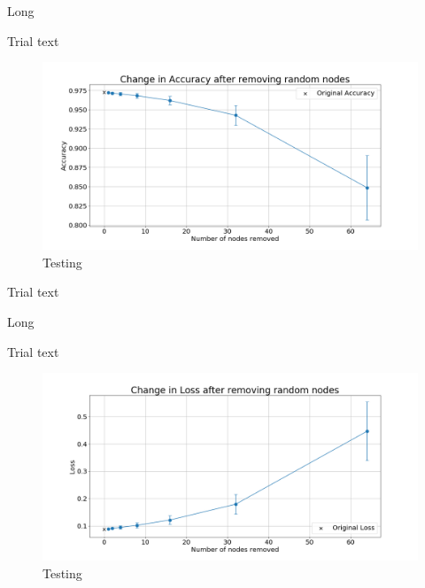 \documentclass[UKenglish]{ifimaster}
\begin{document}
            \begin{table}[h!]
                \centering
                \resizebox{\textwidth}{!}{}
                \caption[Short]{Long}
                \label{tab:ac_rnd_rem_mnist}
            \end{table}

            Trial text

            \begin{figure}[h!]\centering
                \includegraphics[width=\textwidth]{Accuracy_change_random_removal_mnist.png}
                \caption[Short title]{Testing}
                \label{fig:acc_rn_mnist}
            \end{figure}

            Trial text

            \begin{table}[h!]
                \centering
                \resizebox{\textwidth}{!}{}
                \caption[Short]{Long}
                \label{tab:loss_rnd_rem_mnist}
            \end{table}

            Trial text

            \begin{figure}[h!]\centering
                \includegraphics[width=\textwidth]{Loss_change_random_removal_mnist.png}
                \caption[Short title]{Testing}
                \label{fig:loss_rn_mnist}
            \end{figure}
\end{document}
